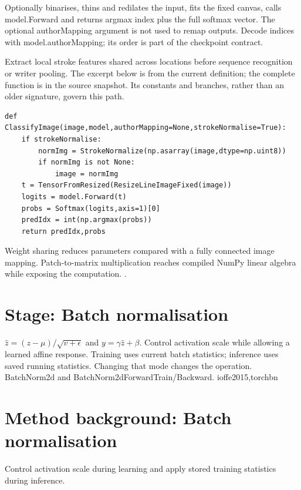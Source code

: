 Optionally binarises, thins and redilates the input, fits the fixed canvas, calls model.Forward and returns argmax index plus the full softmax vector. The optional authorMapping argument is not used to remap outputs. Decode indices with model.authorMapping; its order is part of the checkpoint contract.


Extract local stroke features shared across locations before sequence recognition or writer pooling. The excerpt below is from the current definition; the complete function is in the source snapshot. Its constants and branches, rather than an older signature, govern this path.


\begin{lstlisting}[style=plain]
def ClassifyImage(image,model,authorMapping=None,strokeNormalise=True):
    if strokeNormalise:
        normImg = StrokeNormalize(np.asarray(image,dtype=np.uint8))
        if normImg is not None:
            image = normImg
    t = TensorFromResized(ResizeLineImageFixed(image))
    logits = model.Forward(t)
    probs = Softmax(logits,axis=1)[0]
    predIdx = int(np.argmax(probs))
    return predIdx,probs
\end{lstlisting}
Weight sharing reduces parameters compared with a fully connected image mapping. Patch-to-matrix multiplication reaches compiled NumPy linear algebra while exposing the computation. \cite{shi2017,torchconv,numpystride,numpymatmul}.


\section*{Stage: Batch normalisation}
{$\hat z=(z-\mu)/\sqrt{v+\epsilon}$ and $y=\gamma\hat z+\beta$.}
{Control activation scale while allowing a learned affine response. Training
uses current batch statistics; inference uses saved running statistics.
Changing that mode changes the operation.}
{BatchNorm2d and BatchNorm2dForwardTrain/Backward.}
{ioffe2015,torchbn}


\section{Method background: Batch normalisation}\label{method:bn}
Control activation scale during learning and apply stored training statistics during inference.


